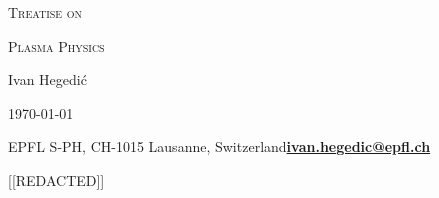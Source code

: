 \thispagestyle{empty}

\vspace*{6.5cm}

\begin{center}
    \Large\textsc{Treatise on}
    
    \textsc{Plasma Physics}

    \vspace*{15pt}

    \LARGE\textemdash\textemdash

    \vspace*{15pt}

    \large Ivan Hegedić

    \vspace*{10pt}

    \LARGE\textemdash\textemdash

    \vspace*{15pt}

    \large\today
    
    \vspace*{10cm}

    \normalsize EPFL S-PH, CH-1015 Lausanne, Switzerland\quad\quad\color{black}\href{mailto:ivan.hegedic@epfl.ch}{\textbf{ivan.hegedic@epfl.ch}}\color{black}
\end{center}

\newpage

\thispagestyle{empty}

\vspace*{\fill}

\begin{center}
    [[REDACTED]]
\end{center}

\vspace*{\fill}

\newpage